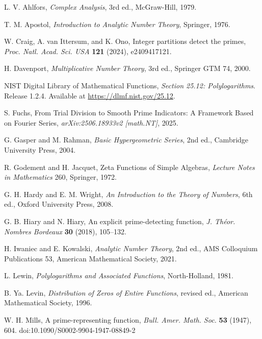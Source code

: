 \documentclass[11pt,a4paper]{amsart}
\theoremstyle{plain}
\theoremstyle{definition}
\theoremstyle{remark}
\begin{document}
\begin{thebibliography}{99}

L. V. Ahlfors, \emph{Complex Analysis}, 3rd ed., McGraw-Hill, 1979.

T. M. Apostol, \emph{Introduction to Analytic Number Theory}, Springer, 1976.

W. Craig, A. van Ittersum, and K. Ono, Integer partitions detect the primes,
\emph{Proc. Natl. Acad. Sci. USA} \textbf{121} (2024), e2409417121.

H. Davenport, \emph{Multiplicative Number Theory}, 3rd ed., Springer GTM 74, 2000.

NIST Digital Library of Mathematical Functions, \emph{Section 25.12: Polylogarithms}. Release 1.2.4. Available at \url{https://dlmf.nist.gov/25.12}.

S. Fuchs, From Trial Division to Smooth Prime Indicators: A Framework Based on Fourier Series, \emph{arXiv:2506.18933v2 [math.NT]}, 2025.

G. Gasper and M. Rahman, \emph{Basic Hypergeometric Series}, 2nd ed., Cambridge University Press, 2004.

R. Godement and H. Jacquet, Zeta Functions of Simple Algebras, \emph{Lecture Notes in Mathematics} 260, Springer, 1972.

G. H. Hardy and E. M. Wright, \emph{An Introduction to the Theory of Numbers}, 6th ed., Oxford University Press, 2008.

G. B. Hiary and N. Hiary, An explicit prime-detecting function, \emph{J. Th\'eor. Nombres Bordeaux} \textbf{30} (2018), 105--132.

H. Iwaniec and E. Kowalski, \emph{Analytic Number Theory}, 2nd ed.,
AMS Colloquium Publications 53, American Mathematical Society, 2021.

L. Lewin, \emph{Polylogarithms and Associated Functions}, North-Holland, 1981.

B. Ya. Levin, \emph{Distribution of Zeros of Entire Functions}, revised ed., American Mathematical Society, 1996.


W. H. Mills, A prime-representing function,
\emph{Bull. Amer. Math. Soc.} \textbf{53} (1947), 604.
doi:10.1090/S0002-9904-1947-08849-2


\end{thebibliography}
\end{document}
